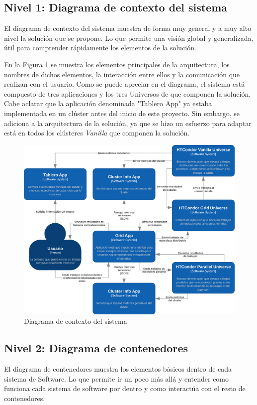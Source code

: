 \subsection{Nivel 1: Diagrama de contexto del sistema}
\noindent
El diagrama de contexto del sistema muestra de forma muy general y a muy alto nivel la solución que se propone. Lo que permite una visión global y generalizada, útil para comprender rápidamente los elementos de la solución.

En la Figura \ref{fig:C4Nivel1} se muestra los elementos principales de la arquitectura, los nombres de dichos elementos, la interacción entre ellos y la comunicación que realizan con el usuario. Como se puede apreciar en el diagrama, el sistema está compuesto de tres aplicaciones y los tres Universos de \HTCondor que componen la solución. Cabe aclarar que la aplicación denominada "Tablero App" ya estaba implementada en un clúster antes del inicio de este proyecto. Sin embargo, se adiciona a la arquitectura de la solución, ya que se hizo un esfuerzo para adaptar está en todos los clústeres \textit{Vanilla} que componen la solución.

\begin{figure}[H]
	\centering
	\includegraphics[scale=0.1]{tablas-images/C4/Diagramas HTCondor-Nivel 1.drawio.png}
	\caption{Diagrama de contexto del sistema}
    \label{fig:C4Nivel1}
\end{figure}

\subsection{Nivel 2: Diagrama de contenedores}
\noindent
El diagrama de contenedores muestra los elementos básicos dentro de cada sistema de Software. Lo que permite ir un poco más allá y entender como funciona cada sistema de software por dentro y como interactúa con el resto de contenedores.

